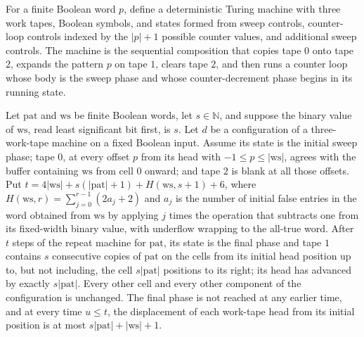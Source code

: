\begin{definition}
\label{Turing.rt_repeatTM}
\leanok
{}
For a finite Boolean word $p$, define a deterministic Turing machine with three work
tapes, Boolean symbols, and states formed from sweep controls, counter-loop controls
indexed by the $|p|+1$ possible counter values, and additional sweep controls. The
machine is the sequential composition that copies tape $0$ onto tape $2$, expands the
pattern $p$ on tape $1$, clears tape $2$, and then runs a counter loop whose body is the
sweep phase and whose counter-decrement phase begins in its running state.
\end{definition}

\begin{theorem}
\label{Turing.rt_repeat_run}
\leanok
{}
Let $\mathrm{pat}$ and $\mathrm{ws}$ be finite Boolean words, let $s\in\mathbb{N}$, and
suppose the binary value of $\mathrm{ws}$, read least significant bit first, is $s$. Let
$d$ be a configuration of a three-work-tape machine on a fixed Boolean input. Assume its
state is the initial sweep phase; tape $0$, at every offset $p$ from its head with
$-1\le p\le |\mathrm{ws}|$, agrees with the buffer containing $\mathrm{ws}$ from cell
$0$ onward; and tape $2$ is blank at all those offsets. Put
$t=4|\mathrm{ws}|+s(|\mathrm{pat}|+1)+H(\mathrm{ws},s+1)+6$, where
$H(\mathrm{ws},r)=\sum_{j=0}^{r-1}(2a_j+2)$ and $a_j$ is the number of initial false
entries in the word obtained from $\mathrm{ws}$ by applying $j$ times the operation that
subtracts one from its fixed-width binary value, with underflow wrapping to the all-true
word. After $t$ steps of the repeat machine for $\mathrm{pat}$, its state is the final
phase and tape $1$ contains $s$ consecutive copies of $\mathrm{pat}$ on the cells from
its initial head position up to, but not including, the cell $s|\mathrm{pat}|$ positions
to its right; its head has advanced by exactly $s|\mathrm{pat}|$. Every other cell and
every other component of the configuration is unchanged. The final phase is not reached
at any earlier time, and at every time $u\le t$, the displacement of each work-tape head
from its initial position is at most $s|\mathrm{pat}|+|\mathrm{ws}|+1$.
\end{theorem}

